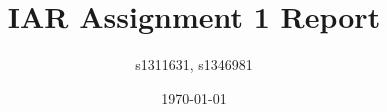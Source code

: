 \documentclass[11pt]{article}
\begin{document}
\title{IAR Assignment 1 Report}
\author{s1311631, s1346981}
\date{\today}
\maketitle

\end{document}
